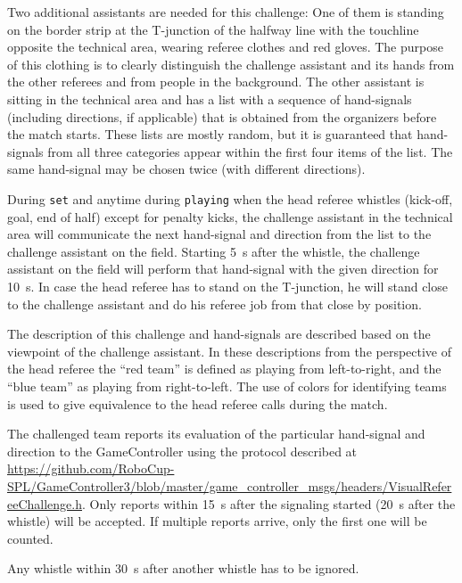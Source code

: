 Two additional assistants are needed for this challenge:
One of them is standing on the border strip at the T-junction of the halfway line with the touchline opposite the technical area, wearing referee clothes and red gloves.
The purpose of this clothing is to clearly distinguish the challenge assistant and its hands from the other referees and from people in the background.
The other assistant is sitting in the technical area and has a list with a sequence of hand-signals (including directions, if applicable) that is obtained from the organizers before the match starts.
These lists are mostly random, but it is guaranteed that hand-signals from all three categories appear within the first four items of the list.
The same hand-signal may be chosen twice (with different directions). %

During \texttt{set} and anytime during \texttt{playing} when the head referee whistles (kick-off, goal, end of half) except for penalty kicks, the challenge assistant in the technical area will communicate the next hand-signal and direction from the list to the challenge assistant on the field.
Starting \qty{5}{\second} after the whistle, the challenge assistant on the field will perform that hand-signal with the given direction for \qty{10}{\second}.
In case the head referee has to stand on the T-junction, he will stand close to the challenge assistant and do his referee job from that close by position.

The description of this challenge and hand-signals are described based on the viewpoint of the challenge assistant. In these descriptions from the perspective of the head referee the ``red team'' is defined as playing from left-to-right, and the ``blue team'' as playing from right-to-left. The use of colors for identifying teams is used to give equivalence to the head referee calls during the match.

The challenged team reports its evaluation of the particular hand-signal and direction to the GameController using the protocol described at \url{https://github.com/RoboCup-SPL/GameController3/blob/master/game_controller_msgs/headers/VisualRefereeChallenge.h}.
Only reports within \qty{15}{\second} after the signaling started (\ie \qty{20}{\second} after the whistle) will be accepted.
If multiple reports arrive, only the first one will be counted.

Any whistle within \qty{30}{\second} after another whistle has to be ignored.

